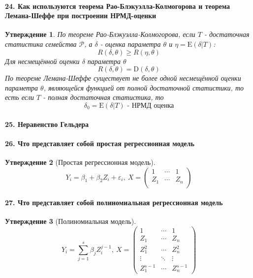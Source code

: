 \documentclass[titlepage]{article}
\newcommand{\sP}{\mathcal{P}}
\newcommand{\sE}{\mathrm{E}}
\newcommand{\sD}{\mathrm{D}}
\newtheorem*{statement}{Утверждение}
\begin{document}
\paragraph{24. Как используются теорема Рао-Блэкуэлла-Колмогорова и теорема Лемана-Шеффе при построении НРМД-оценки}
\begin{statement}
	По теореме Рао-Блэкуэлла-Колмогорова, если $T$ - достаточная статистика семейства $\sP$, а $\delta$ - оценка параметра $\theta$ и $\eta=\sE(\delta|T)$:
	\[R(\delta,\theta)\geq R(\eta,\theta)\]
	Для несмещённой оценки $\delta$ параметра $\theta$
	\[R(\delta,\theta) = \sD(\delta, \theta)\]
	По теореме Лемана-Шеффе существует не более одной несмещённой оценки параметра $\theta$, являющейся функцией от полной достаточной статистики, то есть если $T$ - полная достаточная статистика, то
	\[\delta_0 = \sE(\delta|T) \text{ - НРМД оценка}\]
\end{statement}
\paragraph{25. Неравенство Гельдера}

\paragraph{26. Что представляет собой простая регрессионная модель}
\begin{statement}[Простая регрессионная модель]
	\[Y_i = \beta_1 + \beta_2 Z_i + \varepsilon_i,\ X = \begin{pmatrix}
		1   & \cdots & 1\\
		Z_1 & \cdots & Z_n\\
	\end{pmatrix}\]
\end{statement}

\paragraph{27. Что представляет собой полиномиальная регрессионная модель}
\begin{statement}[Полиномиальная модель]
	\[Y_i = \sum_{j=1}^s \beta_jZ_i^{j-1},\ X = \begin{pmatrix}
		1 & \cdots & 1\\
		Z_1 & \cdots & Z_n\\
		Z_1^2 & \cdots & Z_n^2\\
		\vdots & \ddots & \vdots\\
		Z_1^{s-1} & \cdots & Z_n^{s-1}
	\end{pmatrix}\]
\end{statement}
\end{document}
